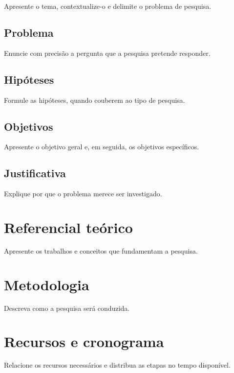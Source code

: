 \documentclass[12pt,a4paper,oneside]{book}
\begin{document}
Apresente o tema, contextualize-o e delimite o problema de pesquisa.

\section{Problema}\label{sec:problema}

Enuncie com precisão a pergunta que a pesquisa pretende responder.

\section{Hipóteses}\label{sec:hipoteses}

Formule as hipóteses, quando couberem ao tipo de pesquisa.

\section{Objetivos}\label{sec:objetivos}

Apresente o objetivo geral e, em seguida, os objetivos específicos.

\section{Justificativa}\label{sec:justificativa}

Explique por que o problema merece ser investigado.

\chapter{Referencial teórico}\label{cap:referencial}

Apresente os trabalhos e conceitos que fundamentam a pesquisa.

\chapter{Metodologia}\label{cap:metodologia}

Descreva como a pesquisa será conduzida.

\chapter{Recursos e cronograma}\label{cap:recursos}

Relacione os recursos necessários e distribua as etapas no tempo
disponível.


\backmatter

%
\end{document}
